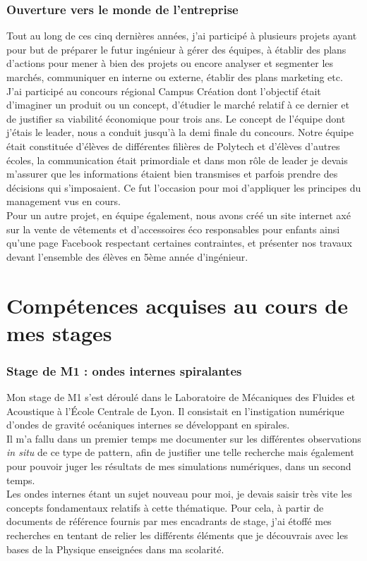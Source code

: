 \documentclass[french]{article}
\newcommand{\brick}{\color{brick}}
\newcommand{\sbrown}{\color{sbrown}}
\begin{document}
 \subsubsection*{\sbrown  Ouverture vers le monde de l'entreprise}
 Tout au long de ces cinq dernières années, j'ai participé à plusieurs projets ayant pour but de préparer le futur ingénieur à gérer des équipes, à établir des plans d'actions pour mener à bien des projets ou encore analyser et segmenter les marchés, communiquer en interne ou externe, établir des plans marketing etc.
\\
J'ai participé au concours régional Campus Création dont l'objectif était d'imaginer un produit ou un concept, d'étudier le marché relatif à ce dernier et de justifier sa viabilité économique pour trois ans. Le concept de l'équipe dont j'étais le leader, nous a conduit jusqu'à la demi finale du concours. Notre équipe était constituée d'élèves de différentes filières de Polytech et d'élèves d'autres écoles, la communication était primordiale et dans mon rôle de leader je devais m'assurer que les informations étaient bien transmises et parfois prendre des décisions qui s'imposaient. Ce fut l'occasion pour moi d'appliquer les principes du management vus en cours.\\
Pour un autre projet, en équipe également, nous avons créé un site internet axé sur la vente de vêtements et d'accessoires éco responsables pour enfants ainsi qu'une page Facebook respectant certaines contraintes, et présenter nos travaux devant l'ensemble des élèves en 5ème année d'ingénieur.
 
 \section*{\brick Compétences acquises au cours de mes stages}
  \subsubsection*{\sbrown  Stage de M1 : ondes internes spiralantes}
 Mon stage de M1 s'est déroulé dans le Laboratoire de Mécaniques des Fluides et Acoustique à l'École Centrale de Lyon. Il consistait en l'instigation numérique d'ondes de gravité océaniques internes se développant en spirales. \\
 Il m'a fallu dans un premier temps me documenter sur les différentes observations \textit{in situ} de ce type de pattern, afin de justifier une telle recherche mais également pour pouvoir juger les résultats de mes simulations numériques, dans un second temps. \\
 Les ondes internes étant un sujet nouveau pour moi, je devais saisir très vite les concepts fondamentaux relatifs à cette thématique. Pour cela, à partir de documents de référence fournis par mes encadrants de stage, j'ai étoffé mes recherches en tentant de relier les différents éléments que je découvrais avec les bases de la Physique enseignées dans ma scolarité.\\
 
\end{document}
